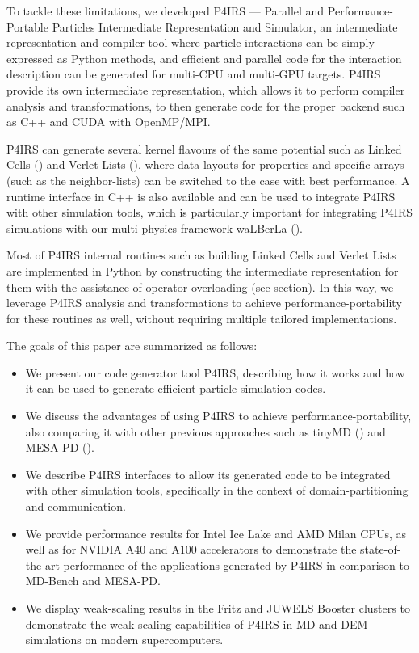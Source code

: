 \documentclass[Afour,sageh,times]{sagej}
\begin{document}
To tackle these limitations, we developed P4IRS --- Parallel and Performance-Portable Particles Intermediate Representation and Simulator, an intermediate representation and compiler tool where particle interactions can be simply expressed as Python methods, and efficient and parallel code for the interaction description can be generated for multi-CPU and multi-GPU targets.
P4IRS provide its own intermediate representation, which allows it to perform compiler analysis and transformations, to then generate code for the proper backend such as C++ and CUDA with OpenMP/MPI.

P4IRS can generate several kernel flavours of the same potential such as Linked Cells (\cite{linkedcells}) and Verlet Lists (\cite{verletlists}), where data layouts for properties and specific arrays (such as the neighbor-lists) can be switched to the case with best performance.
A runtime interface in C++ is also available and can be used to integrate P4IRS with other simulation tools, which is particularly important for integrating P4IRS simulations with our multi-physics framework waLBerLa (\cite{walberla1,walberla2}).

Most of P4IRS internal routines such as building Linked Cells and Verlet Lists are implemented in Python by constructing the intermediate representation for them with the assistance of operator overloading (see  section).
In this way, we leverage P4IRS analysis and transformations to achieve performance-portability for these routines as well, without requiring multiple tailored implementations.

The goals of this paper are summarized as follows:
\begin{itemize}
    \item We present our code generator tool P4IRS, describing how it works and how it can be used to generate efficient particle simulation codes.
    \item We discuss the advantages of using P4IRS to achieve performance-portability, also comparing it with other previous approaches such as tinyMD (\cite{tinymd}) and MESA-PD (\cite{mesapd1,mesapd2}).
    \item We describe P4IRS interfaces to allow its generated code to be integrated with other simulation tools, specifically in the context of domain-partitioning and communication.
    \item We provide performance results for Intel Ice Lake and AMD Milan CPUs, as well as for NVIDIA A40 and A100 accelerators to demonstrate the state-of-the-art performance of the applications generated by P4IRS in comparison to MD-Bench and MESA-PD.
    \item We display weak-scaling results in the Fritz and JUWELS Booster clusters to demonstrate the weak-scaling capabilities of P4IRS in MD and DEM simulations on modern supercomputers.
\end{itemize}
\end{document}
